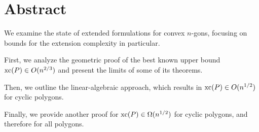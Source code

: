 \section*{Abstract}

We examine the state of extended formulations for convex $n$-gons, focusing on bounds for the extension complexity in particular.

First, we analyze the geometric proof of the best known upper bound $\operatorname{xc}(P) \in O(n^{2/3})$ and present the limits of some of its theorems.

Then, we outline the linear-algebraic approach, which results in $\operatorname{xc}(P) \in O(n^{1/2})$ for cyclic polygons.

Finally, we provide another proof for $\operatorname{xc}(P) \in \Omega(n^{1/2})$ for cyclic polygons, and therefore for all polygons.

